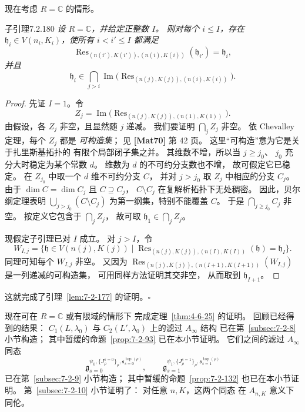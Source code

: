 现在考虑 $R=\mathbb C$ 的情形。

\begin{statement}{子引理}{7.2.180}\label{sublem:7-2-180}\itshape
设 $R=\mathbb C$，并给定正整数 $I$。
则对每个 $i\le I$，存在
$\mathfrak h_i\in V(n_i,K_i)$，使所有
$i<i'\le I$ 都满足
\[
\operatorname{Res}_{(n(i'),K(i')),(n(i),K(i))}
(\mathfrak h_{i'})=\mathfrak h_i,
\]
并且
\[
\mathfrak h_i\in
\bigcap_{j>i}\operatorname{Im}
\bigl(\operatorname{Res}_{(n(j),K(j)),(n(i),K(i))}\bigr).
\]
\end{statement}

\begin{proof}
先证 $I=1$。令
\[
Z_j=\operatorname{Im}
\bigl(\operatorname{Res}_{(n(j),K(j)),(n(1),K(1))}\bigr).
\]
由假设，各 $Z_j$ 非空，且显然随 $j$ 递减。
我们要证明 $\bigcap_jZ_j$ 非空。
依 Chevalley 定理，每个 $Z_j$ 都是
\emph{可构造集}；
见 \textbf{[Mat70]} 第 42 页。
这里“可构造”意为它是关于扎里斯基拓扑的
有限个局部闭子集之并。
其维数不增，所以当 $j\ge j_0$、
$j_0$ 充分大时稳定为某个常数 $d$。
维数为 $d$ 的不可约分支数也不增，
故可假定它已稳定。
在 $Z_{j_0}$ 中取一个 $d$ 维不可约分支 $C$，
并对 $j>j_0$ 取 $Z_j$ 中相应的分支 $C_j$。
由于 $\dim C=\dim C_j$ 且 $C\supseteq C_j$，
$C\setminus C_j$ 在复解析拓扑下无处稠密。
因此，贝尔纲定理表明
$\bigcup_{j>j_0}(C\setminus C_j)$
为第一纲集，特别不能覆盖 $C$。
于是 $\bigcap_{j\ge j_0}C_j$ 非空。
按定义它包含于 $\bigcap_jZ_j$，
故可取
$\mathfrak h_1\in\bigcap_jZ_j$。

现假定子引理已对 $I$ 成立。
对 $j>I$，令
\[
W_{I,j}=\bigl\{\mathfrak h\in V(n(j),K(j))
\mid
\operatorname{Res}_{(n(j),K(j)),(n(I),K(I))}
(\mathfrak h)=\mathfrak h_I\bigr\}.
\]
同理可知每个 $W_{I,j}$ 非空。
又因为
$\operatorname{Res}_{(n(j),K(j)),(n(I+1),K(I+1))}
(W_{I,j})$
是一列递减的可构造集，
可用同样方法证明其交非空，
从而取到 $\mathfrak h_{I+1}$。
\end{proof}

这就完成了引理~\ref{lem:7-2-177} 的证明。\hfill$\square$

现在可在 $R=\mathbb C$ 或有限域的情形下
完成定理~\ref{thm:4-6-25} 的证明。
回顾已经得到的结果：
$C_1(L,\lambda_0)$ 与 $C_2(L',\lambda_0)$
上的滤过 $A_\infty$ 结构
已在第~\ref{subsec:7-2-8} 小节构造；
其中暂缓的命题~\ref{prop:7-2-93}
已在本小节证明。
它们之间的滤过 $A_\infty$ 同态
\[
\mathfrak g_{s=0}^{\psi_0,\{J_\rho^{s=0}\}_\rho,
\mathfrak s_{s=0}^{\operatorname{top}(\rho)}},
\qquad
\mathfrak g_{s=1}^{\psi_1,\{J_\rho^{s=1}\}_\rho,
\mathfrak s_{s=1}^{\operatorname{top}(\rho)}}
\]
已在第~\ref{subsec:7-2-9} 小节构造；
其中暂缓的命题~\ref{prop:7-2-132}
也已在本小节证明。
第~\ref{subsec:7-2-10} 小节证明了：
对任意 $n,K$，这两个同态
在 $A_{n,K}$ 意义下同伦。

